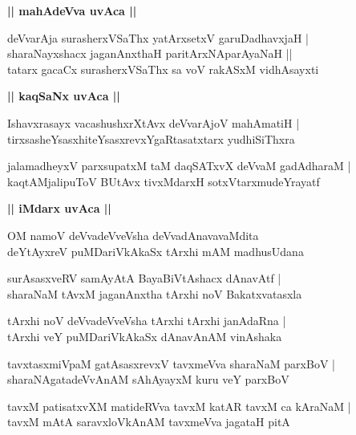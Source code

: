 \documentclass[twoside,12pt,openright]{book}
\newcounter{shloka}[chapter]
\def\uvaca#1{\centerline{{\large\textbf{#1}}}}
\begin{document}
\uvaca{|| mahAdeVva uvAca ||}

\begin{shloka}%
deVvarAja surasherxVSaThx yatArxsetxV garuDadhavxjaH |\\
sharaNayxshacx jaganAnxthaH paritArxNAparAyaNaH ||\\
tatarx gacaCx surasherxVSaThx sa voV rakASxM vidhAsayxti
\end{shloka}

\uvaca{|| kaqSaNx uvAca ||}

\begin{shloka}%
Ishavxrasayx vacashushxrXtAvx deVvarAjoV mahAmatiH |\\
tirxsasheYsasxhiteYsasxrevxYgaRtasatxtarx yudhiSiThxra
\end{shloka}

\begin{shloka}%
jalamadheyxV parxsupatxM taM daqSATxvX deVvaM gadAdharaM |\\
kaqtAMjalipuToV BUtAvx tivxMdarxH sotxVtarxmudeYrayatf
\end{shloka}

\uvaca{|| iMdarx uvAca ||}

\begin{shloka}%
OM namoV deVvadeVveVsha deVvadAnavavaMdita \\
deYtAyxreV puMDariVkAkaSx tArxhi mAM madhusUdana
\end{shloka}

\begin{shloka}%
surAsasxveRV samAyAtA BayaBiVtAshacx dAnavAtf |\\
sharaNaM tAvxM jaganAnxtha tArxhi noV Bakatxvatasxla
\end{shloka}

\begin{shloka}%
tArxhi noV deVvadeVveVsha tArxhi tArxhi janAdaRna |\\
tArxhi veY puMDariVkAkaSx dAnavAnAM vinAshaka
\end{shloka}

\begin{shloka}%
tavxtasxmiVpaM gatAsasxrevxV tavxmeVva sharaNaM parxBoV |\\
sharaNAgatadeVvAnAM sAhAyayxM kuru veY parxBoV
\end{shloka}

\begin{shloka}%
tavxM patisatxvXM matideRVva tavxM katAR tavxM ca kAraNaM |\\
tavxM mAtA saravxloVkAnAM tavxmeVva jagataH pitA
\end{shloka}
\end{document}
